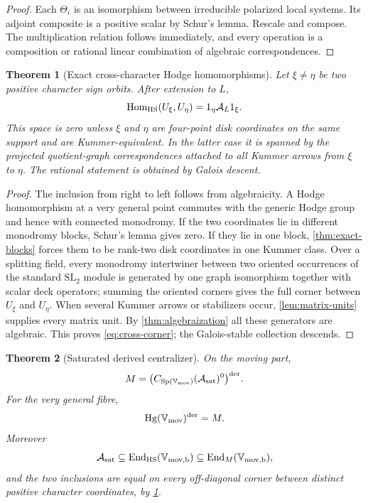 \documentclass[11pt]{article}
\newtheorem{theorem}{Theorem}[section]
\theoremstyle{definition}
\theoremstyle{remark}
\newcommand{\Hg}{\operatorname{Hg}}
\newcommand{\End}{\operatorname{End}}
\newcommand{\Hom}{\operatorname{Hom}}
\newcommand{\Sp}{\operatorname{Sp}}
\begin{document}
\begin{proof}
Each $\Theta_i$ is an isomorphism between irreducible polarized local systems.  Its adjoint composite is a positive scalar by Schur's lemma.  Rescale and compose.  The multiplication relation follows immediately, and every operation is a composition or rational linear combination of algebraic correspondences.
\end{proof}

\begin{theorem}[Exact cross-character Hodge homomorphisms]\label{thm:cross-hom}
Let $\xi\ne\eta$ be two positive character sign orbits.  After extension to $L$,
\begin{equation}\label{eq:cross-corner}
 \Hom_{\rm HS}(U_\xi,U_\eta)
 =1_\eta\mathcal A_L1_\xi.
\end{equation}
This space is zero unless $\xi$ and $\eta$ are four-point disk coordinates on the same support and are Kummer-equivalent.  In the latter case it is spanned by the projected quotient-graph correspondences attached to all Kummer arrows from $\xi$ to $\eta$.  The rational statement is obtained by Galois descent.
\end{theorem}

\begin{proof}
The inclusion from right to left follows from algebraicity.  A Hodge homomorphism at a very general point commutes with the generic Hodge group and hence with connected monodromy.  If the two coordinates lie in different monodromy blocks, Schur's lemma gives zero.  If they lie in one block, \cref{thm:exact-blocks} forces them to be rank-two disk coordinates in one Kummer class.  Over a splitting field, every monodromy intertwiner between two oriented occurrences of the standard $\mathrm{SL}_2$ module is generated by one graph isomorphism together with scalar deck operators; summing the oriented corners gives the full corner between $U_\xi$ and $U_\eta$.  When several Kummer arrows or stabilizers occur, \cref{lem:matrix-units} supplies every matrix unit.  By \cref{thm:algebraization} all these generators are algebraic.  This proves \eqref{eq:cross-corner}; the Galois-stable collection descends.
\end{proof}

\begin{theorem}[Saturated derived centralizer]\label{thm:saturated-centralizer}
On the moving part,
\begin{equation}\label{eq:centralizer}
 M=\bigl(C_{\Sp(\mathbb V_{\rm mov})}(\mathcal A_{\rm sat})^0\bigr)^{\rm der}.
\end{equation}
For the very general fibre,
\begin{equation}\label{eq:hg-mon}
 \Hg(\mathbb V_{\rm mov})^{\rm der}=M.
\end{equation}
Moreover
\begin{equation}\label{eq:end-inclusions}
 \mathcal A_{\rm sat}
 \subseteq\End_{\rm HS}(\mathbb V_{\rm mov,b})
 \subseteq\End_M(\mathbb V_{\rm mov,b}),
\end{equation}
and the two inclusions are equal on every off-diagonal corner between distinct positive character coordinates, by \cref{thm:cross-hom}.
\end{theorem}
\end{document}

